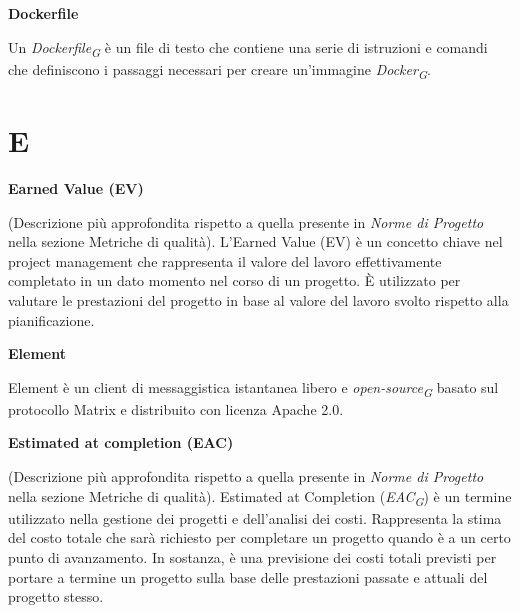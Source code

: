 \documentclass{article}
\begin{document}
\vspace{0.4cm}

\textbf{Dockerfile}

\vspace{0.1cm}

Un \textit{Dockerfile}\textsubscript{\textit{G}} è un file di testo che contiene una serie di istruzioni e comandi che definiscono i passaggi necessari per creare un'immagine \textit{Docker}\textsubscript{\textit{G}}.

\pagebreak
\section*{E}
{}

\vspace{0.4cm}

\textbf{Earned Value (EV)}

\vspace{0.1cm}

(Descrizione più approfondita rispetto a quella presente in \textit{Norme di Progetto} nella sezione Metriche di qualità). L'Earned Value (EV) è un concetto chiave nel project management che rappresenta il valore del lavoro effettivamente completato in un dato momento nel corso di un progetto. È utilizzato per valutare le prestazioni del progetto in base al valore del lavoro svolto rispetto alla pianificazione.

\vspace{0.4cm}

\textbf{Element}

\vspace{0.1cm}

Element è un client di messaggistica istantanea libero e \textit{open-source}\textsubscript{\textit{G}} basato sul protocollo Matrix e distribuito con licenza Apache 2.0.

\vspace{0.4cm}

\textbf{Estimated at completion (EAC)}

\vspace{0.1cm}

(Descrizione più approfondita rispetto a quella presente in \textit{Norme di Progetto} nella sezione Metriche di qualità). Estimated at Completion (\textit{EAC}\textsubscript{\textit{G}}) è un termine utilizzato nella gestione dei progetti e dell'analisi dei costi. Rappresenta la stima del costo totale che sarà richiesto per completare un progetto quando è a un certo punto di avanzamento. In sostanza, è una previsione dei costi totali previsti per portare a termine un progetto sulla base delle prestazioni passate e attuali del progetto stesso.
\end{document}
